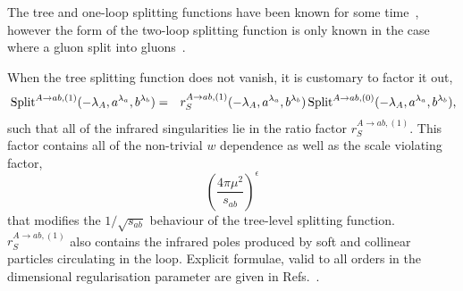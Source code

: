\documentclass[paper,notoc,nohyper]{JHEP3}
\def\e{\epsilon}
\def\Split{\, {\rm Split}}
\def\e{\epsilon}
\begin{document}
The tree and one-loop splitting functions have been known for some time~\cite{Mangano:multipart,Bern:split1e0,Bern:split1gluon,Bern:split1QCD}, however the form of the 
two-loop splitting function is only known in the case where a gluon split into gluons~\cite{Bern:2lsplit}. 

When the tree splitting function does not vanish, it is customary to factor it out,  
\begin{eqnarray}
\label{eq:r1def}
\Split^{A \to ab,(1)}({-\lambda_A},a^{\lambda_a},b^{\lambda_b}) 
&=& r_{S}^{A \to ab,(1)}({-\lambda_A},a^{\lambda_a},b^{\lambda_b})
\Split^{A \to ab,(0)}({-\lambda_A},a^{\lambda_a},b^{\lambda_b}),
\end{eqnarray}
such that all of the infrared singularities lie in the ratio factor $r_{S}^{A \to ab,(1)}$.
This factor contains all of the non-trivial $w$ dependence as well as the scale violating 
factor, $$\left(\frac{4\pi\mu^2}{s_{ab}}\right)^{\e}$$ that modifies the $1/\sqrt{s_{ab}}$ behaviour of the
tree-level splitting function.   $r_{S}^{A \to ab,(1)}$ also contains the infrared poles produced by soft and
collinear particles circulating in the loop.  Explicit formulae, valid to all orders in the dimensional
regularisation parameter are given in Refs.~\cite{Bern:split1gluon,Bern:split1QCD}.
\end{document}
